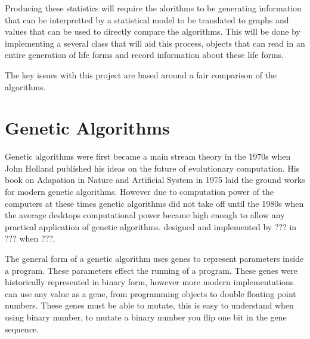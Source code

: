 \documentclass[12pt]{article}
\begin{document}
Producing these statistics will require the alorithms to be generating information that can be interpretted by a statistical model to be translated to graphs and values that can be
used to directly compare the algorithms. This will be done by implementing a several class that will aid this process, objects that can read in an entire generation of life forms
and record information about these life forms. 


The key issues with this project are based around a fair comparison of the algorithms. 

\section{Genetic Algorithms}

Genetic algorithms were first became a main stream theory in the 1970s when John Holland published his ideas on the future of evolutionary 
computation. His book on Adapation in Nature and Artificial System in 1975 laid the ground works for modern genetic algorithms. However due to computation
power of the computers at these times genetic algorithms did not take off until the 1980s when the average desktops computational power became
high enough to allow any practical application of genetic algorithms. designed and implemented by ??? in ??? when ???.

The general form of a genetic algorithm uses genes to represent parameters inside a program.
These parameters effect the running of a program.
These genes were historically represented in binary form, however more modern implementations can use any value as a gene, from programming objects to double floating point numbers.
These genes must be able to mutate, this is easy to understand when using binary number, to mutate a binary number you flip one bit in the gene sequence. 
\end{document}
